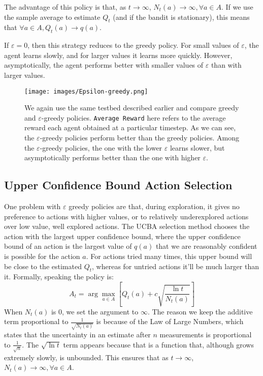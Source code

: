 \documentclass[12pt]{report}
\begin{document}
The advantage of this policy is that, as $t \rightarrow \infty$, $N_{t}(a) \rightarrow \infty, \forall a \in A$. If we use the sample average to estimate 
$Q_{t}$ (and if the bandit is stationary), this means that $\forall a \in A, Q_{t}(a) \rightarrow q(a)$.

If $\varepsilon = 0$, then this strategy reduces to the greedy policy. For small values of $\varepsilon$, the agent learns slowly, and for larger values it learns more quickly.
However, asymptotically, the agent performs better with smaller values of $\varepsilon$ than with larger values.

\begin{figure}[H]
    \centering
    \texttt{[image: images/Epsilon-greedy.png]}
    \caption{We again use the same testbed described earlier and compare greedy and $\varepsilon$-greedy policies. \texttt{Average Reward} here refers to the average reward each agent obtained at a particular timestep. As we can see, the $\varepsilon$-greedy policies perform better than the greedy policies. Among the $\varepsilon$-greedy policies, the one with the lower $\varepsilon$ learns slower, but asymptotically performs better than the one with higher $\varepsilon$.}
\end{figure}

\subsection{Upper Confidence Bound Action Selection}
One problem with $\varepsilon$ greedy policies are that, during exploration, it gives no preference to actions with higher values, or to relatively underexplored actions over low value, well explored actions.
The UCBA selection method chooses the action with the largest upper confidence bound, where the upper confidence bound of an action is the largest value of $q(a)$ that we are reasonably confident is possible for the action $a$.
For actions tried many times, this upper bound will be close to the estimated $Q_{t}$, whereas for untried actions it'll be much larger than it. Formally, speaking the policy is:
\begin{equation}
    A_{t} = \arg\max_{a \in A}\left[Q_{t}(a) + c\sqrt{\frac{\ln t}{N_{t}(a)}}\right]
\end{equation}
When $N_{t}(a)$ is $0$, we set the argument to $\infty$. The reason we keep the additive term proportional to $\frac{1}{\sqrt{N_{t}(a)}}$ is because of the Law of Large Numbers, 
which states that the uncertainty in an estimate after $n$ measurements is proportional to $\frac{1}{\sqrt{n}}$. The $\sqrt{\ln t}$ term appears because that is a function that, although grows extremely slowly,
is unbounded. This ensures that as $t \rightarrow \infty$, $N_{t}(a) \rightarrow \infty, \forall a \in A$. 
\end{document}
